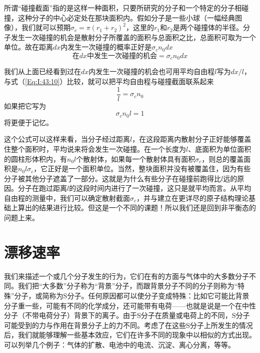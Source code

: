 所谓“碰撞截面”指的是这样一种面积，只要所研究的分子和一个特定的分子相碰撞，这种分子的中心必定处在那块面积内。假如分子是一些小球（一幅经典图像），我们就可以预期$\sigma_c =\pi(r_1 +r_2)^2$，这里的$r_1$和$r_2$是两个碰撞体的半径。分子发生一次碰撞的机会是散射分子所覆盖的面积与总面积之比，总面积可取为一个单位。故在距离$dx$内发生一次碰撞的概率正好是$\sigma_c n_0 dx$
\begin{equation}
    \label{Eq:I:43:10}
    \text{在$dx$中发生一次碰撞的机会}=\sigma_c n_0 dx
\end{equation}

我们从上面已经看到过在$dx$内发生一次碰撞的机会也可用平均自由程$l$写为$dx/l$，与式（\ref{Eq:I:43:10}）比较，就可以把平均自由程与碰撞截面联系起来
\begin{equation}
    \label{Eq:I:43:11}
    \frac{1}{l}=\sigma_c n_0
\end{equation}
如果把它写为
\begin{equation}
    \label{Eq:I:43:12}
    \sigma_c n_0 l = 1
\end{equation}
将更便于记忆。

这个公式可以这样来看，当分子经过距离$l$，在这段距离内散射分子正好能够覆盖住整个面积时，平均说来将会发生一次碰撞。在一个长度为$l$、底面积为单位面积的圆柱形体积内，有$n_0l$个散射体，如果每一个散射体具有面积$\sigma_c$，则总的覆盖面积是$n_0l\sigma_c$，它正好是一个面积单位。当然，整块面积并没有被覆盖住，因为有些分子被其他分子遮盖了一部分。这就是为什么有些分子在碰撞前跑得比$l$远的原因。分子在跑过距离$l$的这段时间内进行了一次碰撞，这只是就平均而言。从平均自由程的测量中，我们可以确定散射截面$\sigma_c$，并与建立在更详尽的原子结构理论基础上算出的结果进行比较。但这是一个不同的课题！所以我们还是回到非平衡态的问题上来。

\section{漂移速率}

我们来描述一个或几个分子发生的行为，它们在有的方面与气体中的大多数分子不同。我们把“大多数”分子称为“背景”分子，而跟背景分子不同的分子则称为“特殊”分子，或简称为S分子。任何原因都可以使分子变成特殊：比如它可能比背景分子重一些，可能有不同的化学成分，还可能带有电荷——也就是说是一个在中性分子（不带电荷分子）背景下的离子。由于S分子在质量或电荷上的不同，S分子可能受到的力与作用在背景分子上的力不同。考虑了在这些S分子上所发生的情况后，我们就能够理解一些基本效应，它们在许多不同的现象中以相似的方式出现。可以列举几个例子：气体的扩散、电池中的电流、沉淀、离心分离，等等。

